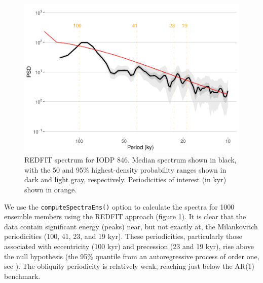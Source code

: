 \documentclass[gchron, manuscript]{copernicus}
\begin{document}
\begin{figure}
\includegraphics[width=12cm]{geoChronR-paper_files/figure-latex/redfit-plot-1} \caption{REDFIT spectrum for IODP 846. Median spectrum shown in black, with the 50 and 95\% highest-density probability ranges shown in dark and light gray, respectively. Periodicities of interest (in kyr) shown in orange.}\label{fig:redfit-plot}
\end{figure}

We use the \texttt{computeSpectraEns()} option to calculate the spectra for 1000 ensemble members using the REDFIT approach (figure \ref{fig:redfit-plot}). It is clear that the data contain significant energy (peaks) near, but not exactly at, the Milankovitch periodicities (100, 41, 23, and 19 kyr). These periodicities, particularly those associated with eccentricity (100 kyr) and precession (23 and 19 kyr), rise above the null hypothesis (the 95\% quantile from an autoregressive process of order one, see \citet{Mudelsee_NPG09}).
The obliquity periodicity is relatively weak, reaching just below the AR(1) benchmark.
\end{document}
